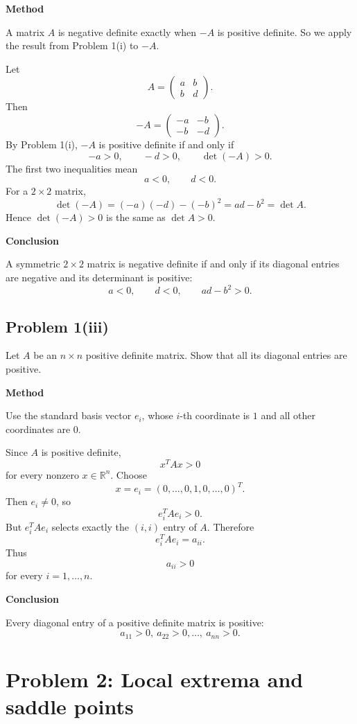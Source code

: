 \documentclass[11pt]{article}
\newenvironment{methodbox}[1]{\par\medskip\noindent\textcolor{lineblue}{\textbf{#1}}\par\smallskip}{\par\medskip}
\newenvironment{answerbox}[1]{\par\medskip\noindent\textcolor{linegreen}{\textbf{#1}}\par\smallskip}{\par\medskip}
\newcommand{\R}{\mathbb{R}}
\begin{document}
\begin{methodbox}{Method}
A matrix $A$ is negative definite exactly when $-A$ is positive definite.  So we apply the result from Problem 1(i) to $-A$.
\end{methodbox}

Let
\[
A=\begin{pmatrix}a&b\\b&d\end{pmatrix}.
\]
Then
\[
-A=\begin{pmatrix}-a&-b\\-b&-d\end{pmatrix}.
\]
By Problem 1(i), $-A$ is positive definite if and only if
\[
-a>0,
\qquad -d>0,
\qquad \det(-A)>0.
\]
The first two inequalities mean
\[
a<0,
\qquad d<0.
\]
For a $2\times 2$ matrix,
\[
\det(-A)=(-a)(-d)-(-b)^2=ad-b^2=\det A.
\]
Hence $\det(-A)>0$ is the same as $\det A>0$.

\begin{answerbox}{Conclusion}
A symmetric $2\times 2$ matrix is negative definite if and only if its diagonal entries are negative and its determinant is positive:
\[
a<0,
\qquad d<0,
\qquad ad-b^2>0.
\]
\end{answerbox}

\subsection*{Problem 1(iii)}
Let $A$ be an $n\times n$ positive definite matrix. Show that all its diagonal entries are positive.

\begin{methodbox}{Method}
Use the standard basis vector $e_i$, whose $i$-th coordinate is $1$ and all other coordinates are $0$.
\end{methodbox}

Since $A$ is positive definite,
\[
x^T A x>0
\]
for every nonzero $x\in\R^n$.  Choose
\[
x=e_i=(0,\ldots,0,1,0,\ldots,0)^T.
\]
Then $e_i\neq0$, so
\[
e_i^T A e_i>0.
\]
But $e_i^T A e_i$ selects exactly the $(i,i)$ entry of $A$. Therefore
\[
e_i^T A e_i=a_{ii}.
\]
Thus
\[
a_{ii}>0
\]
for every $i=1,\ldots,n$.

\begin{answerbox}{Conclusion}
Every diagonal entry of a positive definite matrix is positive:
\[
a_{11}>0,
\ a_{22}>0,
\ldots,
\ a_{nn}>0.
\]
\end{answerbox}

\newpage
\section{Problem 2: Local extrema and saddle points}
\end{document}
